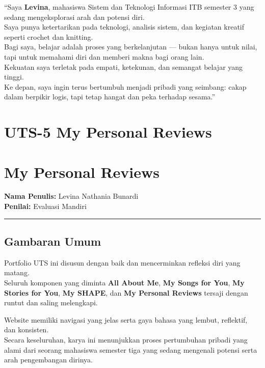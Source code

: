 \documentclass[
  letterpaper,
  DIV=11,
  numbers=noendperiod]{scrreprt}
\begin{document}
``Saya \textbf{Levina}, mahasiswa Sistem dan Teknologi Informasi ITB
semester 3 yang sedang mengeksplorasi arah dan potensi diri.\\
Saya punya ketertarikan pada teknologi, analisis sistem, dan kegiatan
kreatif seperti crochet dan knitting.\\
Bagi saya, belajar adalah proses yang berkelanjutan --- bukan hanya
untuk nilai, tapi untuk memahami diri dan memberi makna bagi orang
lain.\\
Kekuatan saya terletak pada empati, ketekunan, dan semangat belajar yang
tinggi.\\
Ke depan, saya ingin terus bertumbuh menjadi pribadi yang seimbang:
cakap dalam berpikir logis, tapi tetap hangat dan peka terhadap
sesama.''


\chapter{UTS-5 My Personal Reviews}\label{uts-5-my-personal-reviews}


\chapter{My Personal Reviews}\label{my-personal-reviews}

\textbf{Nama Penulis:} Levina Nathania Bunardi\\
\textbf{Penilai:} Evaluasi Mandiri

\begin{center}\rule{0.5\linewidth}{0.5pt}\end{center}

\section{Gambaran Umum}\label{gambaran-umum}

Portfolio UTS ini disusun dengan baik dan mencerminkan refleksi diri
yang matang.\\
Seluruh komponen yang diminta \textbf{All About Me}, \textbf{My Songs
for You}, \textbf{My Stories for You}, \textbf{My SHAPE}, dan \textbf{My
Personal Reviews} tersaji dengan runtut dan saling melengkapi.

Website memiliki navigasi yang jelas serta gaya bahasa yang lembut,
reflektif, dan konsisten.\\
Secara keseluruhan, karya ini menunjukkan proses pertumbuhan pribadi
yang alami dari seorang mahasiswa semester tiga yang sedang mengenali
potensi serta arah pengembangan dirinya.
\end{document}
